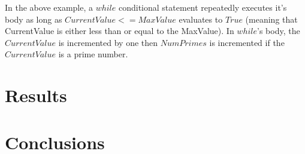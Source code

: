 \documentclass{article}
\begin{document}
	In the above example, a $while$ conditional statement repeatedly executes it's body as long as $CurrentValue <= MaxValue$ evaluates to $True$ (meaning that CurrentValue is either less than or equal to the MaxValue). In $while$'s body, the $CurrentValue$ is incremented by one then $NumPrimes$ is incremented if the $CurrentValue$ is a prime number.

\section{Results}

\section{Conclusions}


\end{document}
